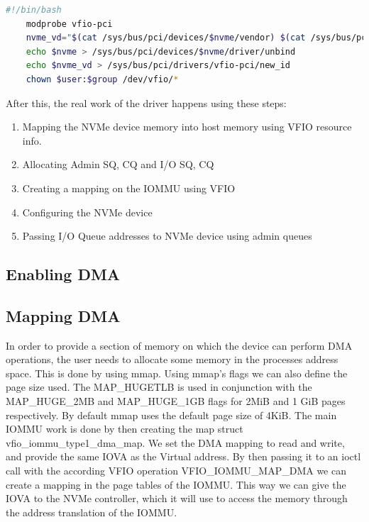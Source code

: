 \begin{lstlisting}[language=bash,caption={Initializing VFIO using bash}]
    #!/bin/bash
    modprobe vfio-pci
    nvme_vd="$(cat /sys/bus/pci/devices/$nvme/vendor) $(cat /sys/bus/pci/devices/$nvme/device)"
    echo $nvme > /sys/bus/pci/devices/$nvme/driver/unbind
    echo $nvme_vd > /sys/bus/pci/drivers/vfio-pci/new_id
    chown $user:$group /dev/vfio/*     
\end{lstlisting}

After this, the real work of the driver happens using these steps:

\begin{enumerate}
    \item Mapping the NVMe device memory into host memory using VFIO resource info.
    \item Allocating Admin SQ, CQ and I/O SQ, CQ
    \item Creating a mapping on the IOMMU using VFIO
    \item Configuring the NVMe device
    \item Passing I/O Queue addresses to NVMe device using admin queues
\end{enumerate}


\subsection{Enabling DMA}

\subsection{Mapping DMA}
In order to provide a section of memory on which the device can perform DMA operations, the user needs to allocate some memory in the processes address space. This is done by using mmap. Using mmap's flags we can also define the page size used. The MAP\_HUGETLB is used in conjunction with the MAP\_HUGE\_2MB and MAP\_HUGE\_1GB flags for 2MiB and 1 GiB pages respectively. By default mmap uses the default page size of 4KiB.
The main IOMMU work is done by then creating the map struct vfio\_iommu\_type1\_dma\_map. We set the DMA mapping to read and write, and provide the same IOVA as the Virtual address. By then passing it to an ioctl call with the according VFIO operation VFIO\_IOMMU\_MAP\_DMA we can create a mapping in the page tables of the IOMMU. This way we can give the IOVA to the NVMe controller, which it will use to access the memory through the address translation of the IOMMU.

